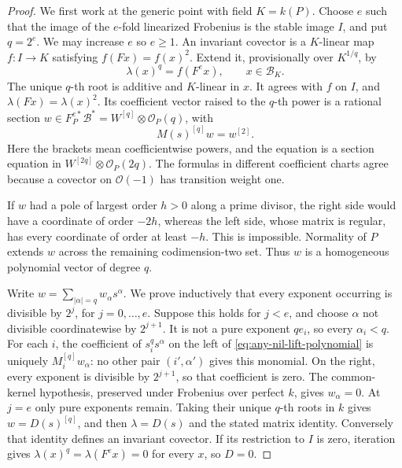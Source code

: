 \begin{proof}
We first work at the generic point with field $K=k(P)$.
Choose $e$ such that the image of the $e$-fold linearized Frobenius is
the stable image $I$, and put $q=2^e$. We may increase $e$ so $e\geq1$.
An invariant covector is a $K$-linear map $f:I\to K$ satisfying
$f(Fx)=f(x)^2$. Extend it, provisionally over $K^{1/q}$, by
\[
                    \lambda(x)^q=f(F^e x),\qquad x\in\mathcal B_K.
\]
The unique $q$-th root is additive and $K$-linear in $x$.
It agrees with $f$ on $I$, and
$\lambda(Fx)=\lambda(x)^2$. Its coefficient vector raised to the
$q$-th power is a rational section
$w\in F_P^{e*}\mathcal B^*=W^{[q]}\otimes\mathcal O_P(q)$, with
\begin{equation}\label{eq:any-nil-lift-polynomial}
                    M(s)^{[q]}w=w^{[2]}.
\end{equation}
Here the brackets mean coefficientwise powers, and the equation is a
section equation in $W^{[2q]}\otimes\mathcal O_P(2q)$.
The formulas in different coefficient charts agree because a covector
on $\mathcal O(-1)$ has transition weight one.

If $w$ had a pole of largest order $h>0$ along a prime divisor, the
right side would have a coordinate of order $-2h$, whereas the left
side, whose matrix is regular, has every coordinate of order at least
$-h$. This is impossible. Normality of $P$ extends $w$ across the
remaining codimension-two set. Thus $w$ is a homogeneous polynomial
vector of degree $q$.

Write $w=\sum_{|\alpha|=q}w_\alpha s^\alpha$.
We prove inductively that every exponent occurring is divisible by
$2^j$, for $j=0,\ldots,e$. Suppose this holds for $j<e$, and choose
$\alpha$ not divisible coordinatewise by $2^{j+1}$.
It is not a pure exponent $qe_i$, so every $\alpha_i<q$.
For each $i$, the coefficient of $s_i^q s^\alpha$ on the left of
\eqref{eq:any-nil-lift-polynomial} is uniquely
$M_i^{[q]}w_\alpha$: no other pair $(i',\alpha')$ gives this monomial.
On the right, every exponent is divisible by $2^{j+1}$, so that
coefficient is zero. The common-kernel hypothesis, preserved under
Frobenius over perfect $k$, gives $w_\alpha=0$.
At $j=e$ only pure exponents remain. Taking their unique $q$-th roots
in $k$ gives $w=D(s)^{[q]}$, and then $\lambda=D(s)$ and the stated
matrix identity. Conversely that identity defines an invariant
covector. If its restriction to $I$ is zero, iteration gives
$\lambda(x)^q=\lambda(F^ex)=0$ for every $x$, so $D=0$.
\end{proof}

